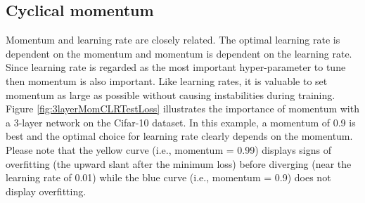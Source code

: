 \documentclass{article} %
\begin{document}
\subsection{Cyclical momentum}
\label{sec:CM}

Momentum and learning rate are closely related.  The optimal learning rate is dependent on the momentum and momentum is dependent on the learning rate.  Since learning rate is regarded as the most important hyper-parameter to tune \citep{bengio2012practical} then momentum is also important.   Like learning rates, it is valuable to set momentum as large as possible without causing instabilities during training.  Figure \ref{fig:3layerMomCLRTestLoss} illustrates the importance of momentum with a 3-layer network on the Cifar-10 dataset.  In this example, a momentum of 0.9 is best and the optimal choice for learning rate clearly depends on the momentum.  Please note that the yellow curve (i.e., momentum = 0.99) displays signs of overfitting (the upward slant after the minimum loss) before diverging (near the learning rate of 0.01) while the blue curve (i.e., momentum = 0.9) does not display overfitting.
\end{document}
